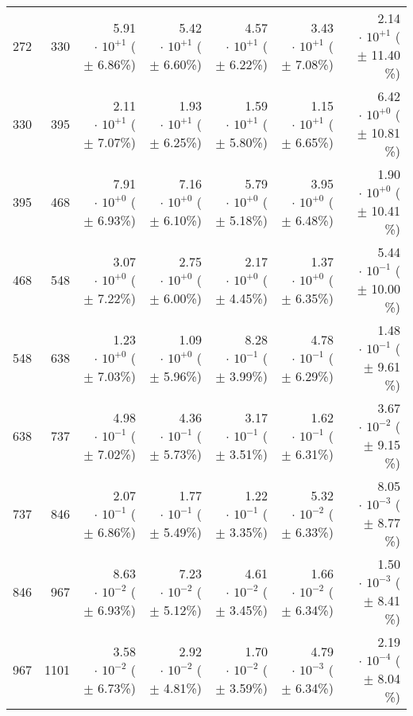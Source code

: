 \begin{table}[h!]
\begin{center}
\begin{tabular}{|r|r|r|r|r|r|r|}
 272 &  330 & 5.91$\,\cdot\, 10^{+1}$  ($\pm\!\!$  6.86\%) & 5.42$\,\cdot\, 10^{+1}$  ($\pm\!\!$  6.60\%) & 4.57$\,\cdot\, 10^{+1}$  ($\pm\!\!$  6.22\%) & 3.43$\,\cdot\, 10^{+1}$  ($\pm\!\!$  7.08\%) & 2.14$\,\cdot\, 10^{+1}$  ($\pm\!\!$ 11.40 \%)\\
 330 &  395 & 2.11$\,\cdot\, 10^{+1}$  ($\pm\!\!$  7.07\%) & 1.93$\,\cdot\, 10^{+1}$  ($\pm\!\!$  6.25\%) & 1.59$\,\cdot\, 10^{+1}$  ($\pm\!\!$  5.80\%) & 1.15$\,\cdot\, 10^{+1}$  ($\pm\!\!$  6.65\%) & 6.42$\,\cdot\, 10^{+0}$  ($\pm\!\!$ 10.81 \%)\\
 395 &  468 & 7.91$\,\cdot\, 10^{+0}$  ($\pm\!\!$  6.93\%) & 7.16$\,\cdot\, 10^{+0}$  ($\pm\!\!$  6.10\%) & 5.79$\,\cdot\, 10^{+0}$  ($\pm\!\!$  5.18\%) & 3.95$\,\cdot\, 10^{+0}$  ($\pm\!\!$  6.48\%) & 1.90$\,\cdot\, 10^{+0}$  ($\pm\!\!$ 10.41 \%)\\
 468 &  548 & 3.07$\,\cdot\, 10^{+0}$  ($\pm\!\!$  7.22\%) & 2.75$\,\cdot\, 10^{+0}$  ($\pm\!\!$  6.00\%) & 2.17$\,\cdot\, 10^{+0}$  ($\pm\!\!$  4.45\%) & 1.37$\,\cdot\, 10^{+0}$  ($\pm\!\!$  6.35\%) & 5.44$\,\cdot\, 10^{-1}$  ($\pm\!\!$ 10.00 \%)\\
 548 &  638 & 1.23$\,\cdot\, 10^{+0}$  ($\pm\!\!$  7.03\%) & 1.09$\,\cdot\, 10^{+0}$  ($\pm\!\!$  5.96\%) & 8.28$\,\cdot\, 10^{-1}$  ($\pm\!\!$  3.99\%) & 4.78$\,\cdot\, 10^{-1}$  ($\pm\!\!$  6.29\%) & 1.48$\,\cdot\, 10^{-1}$  ($\pm\!\!$  9.61 \%)\\
 638 &  737 & 4.98$\,\cdot\, 10^{-1}$  ($\pm\!\!$  7.02\%) & 4.36$\,\cdot\, 10^{-1}$  ($\pm\!\!$  5.73\%) & 3.17$\,\cdot\, 10^{-1}$  ($\pm\!\!$  3.51\%) & 1.62$\,\cdot\, 10^{-1}$  ($\pm\!\!$  6.31\%) & 3.67$\,\cdot\, 10^{-2}$  ($\pm\!\!$  9.15 \%)\\
 737 &  846 & 2.07$\,\cdot\, 10^{-1}$  ($\pm\!\!$  6.86\%) & 1.77$\,\cdot\, 10^{-1}$  ($\pm\!\!$  5.49\%) & 1.22$\,\cdot\, 10^{-1}$  ($\pm\!\!$  3.35\%) & 5.32$\,\cdot\, 10^{-2}$  ($\pm\!\!$  6.33\%) & 8.05$\,\cdot\, 10^{-3}$  ($\pm\!\!$  8.77 \%)\\
 846 &  967 & 8.63$\,\cdot\, 10^{-2}$  ($\pm\!\!$  6.93\%) & 7.23$\,\cdot\, 10^{-2}$  ($\pm\!\!$  5.12\%) & 4.61$\,\cdot\, 10^{-2}$  ($\pm\!\!$  3.45\%) & 1.66$\,\cdot\, 10^{-2}$  ($\pm\!\!$  6.34\%) & 1.50$\,\cdot\, 10^{-3}$  ($\pm\!\!$  8.41 \%)\\
 967 & 1101 & 3.58$\,\cdot\, 10^{-2}$  ($\pm\!\!$  6.73\%) & 2.92$\,\cdot\, 10^{-2}$  ($\pm\!\!$  4.81\%) & 1.70$\,\cdot\, 10^{-2}$  ($\pm\!\!$  3.59\%) & 4.79$\,\cdot\, 10^{-3}$  ($\pm\!\!$  6.34\%) & 2.19$\,\cdot\, 10^{-4}$  ($\pm\!\!$  8.04 \%)\\

\end{tabular}
\end{center}
\end{table}
